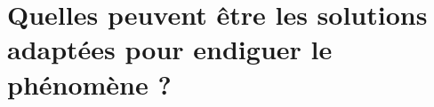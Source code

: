 
\chapter{Quelles peuvent être les solutions adaptées pour endiguer le phénomène ?}\label{solutions}


